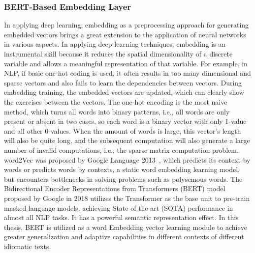 \subsubsection{BERT-Based Embedding Layer}

In applying deep learning, embedding as a preprocessing approach for generating embedded vectors brings a great extension to the application of neural networks in various aspects.  In applying deep learning techniques, embedding is an instrumental skill because it reduces the spatial dimensionality of a discrete variable and allows a meaningful representation of that variable. For example, in NLP, if basic one-hot coding is used, it often results in too many dimensional and sparse vectors and also fails to learn the dependencies between vectors. During embedding training, the embedded vectors are updated, which can clearly show the exercises between the vectors. The one-hot encoding is the most naive method, which turns all words into binary patterns, i.e., all words are only present or absent in two cases, so each word is a binary vector with only 1-value and all other 0-values. When the amount of words is large, this vector's length will also be quite long, and the subsequent computation will also generate a large number of invalid computations, i.e., the sparse matrix computation problem. word2Vec was proposed by Google Language 2013~\cite{church2017word2vec}, which predicts its context by words or predicts words by contexts, a static word embedding learning model, but encounters bottlenecks in solving problems such as polysemous words. The Bidirectional Encoder Representations from Transformers (BERT) model proposed by Google in 2018 utilizes the Transformer as the base unit to pre-train masked language models, achieving State of the art (SOTA) performance in almost all NLP tasks. It has a powerful semantic representation effect. In this thesis, BERT is utilized as a word Embedding vector learning module to achieve greater generalization and adaptive capabilities in different contexts of different idiomatic texts.

